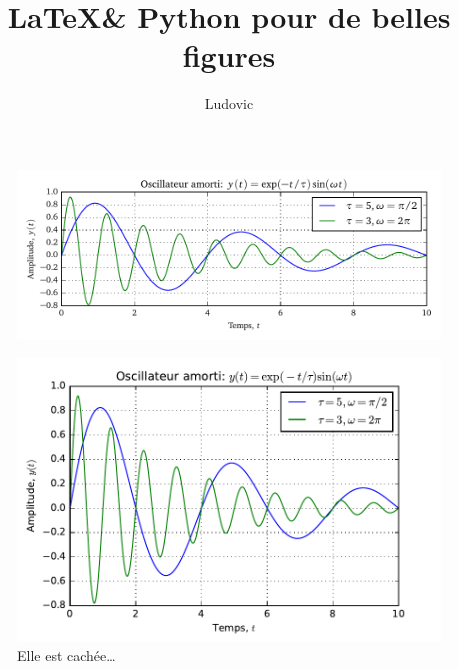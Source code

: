 \documentclass[10pt,a4paper,twoside]{article}
\author{Ludovic}
\title{\LaTeX \& Python pour de belles figures}
\begin{document}
\maketitle

\lipsum[1-4]
\begin{figure}[htb]
\begin{center}
\includegraphics{oscillateur}
\end{center}
\end{figure}
\lipsum[1-4]
\begin{figure}[htb]
\begin{center}
\includegraphics[width = .8\textwidth]{../cachette/oscillateur}
\end{center}
\caption{Elle est cachée\ldots}
\end{figure}
\lipsum[1-8]
\end{document}
